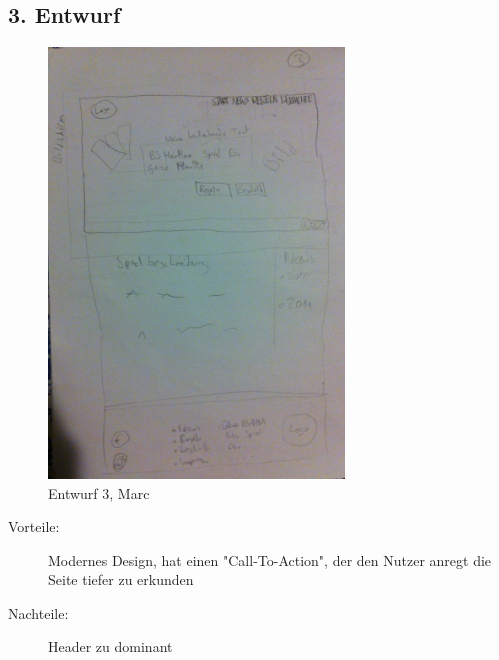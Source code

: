 \documentclass{scrartcl}
\begin{document}
 \subsection*{3. Entwurf}
  \begin{figure}[H]
 \centering
  \includegraphics[width=0.7\textwidth]{Version3.jpg}
\caption{Entwurf 3, Marc}
\end{figure}
 \begin{description}
 \item[Vorteile:] Modernes Design, hat einen "Call-To-Action", der den Nutzer anregt die Seite tiefer zu erkunden
 \item[Nachteile:] Header zu dominant
  \end{description}

 
\end{document}

